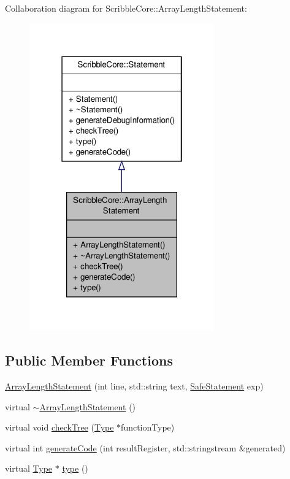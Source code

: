 Collaboration diagram for Scribble\-Core\-:\-:Array\-Length\-Statement\-:
\nopagebreak
\begin{figure}[H]
\begin{center}
\leavevmode
\includegraphics[width=226pt]{class_scribble_core_1_1_array_length_statement__coll__graph}
\end{center}
\end{figure}
\subsection*{Public Member Functions}
\begin{DoxyCompactItemize}
\item 
\hyperlink{class_scribble_core_1_1_array_length_statement_a0f373eaf826db2565073f5da6b7d3de7}{Array\-Length\-Statement} (int line, std\-::string text, \hyperlink{namespace_scribble_core_a2ad5bf236bc9164cb56f564685f15a11}{Safe\-Statement} exp)
\item 
virtual \hyperlink{class_scribble_core_1_1_array_length_statement_aca514b8a7518cae4286fd3a7ae2fac95}{$\sim$\-Array\-Length\-Statement} ()
\item 
virtual void \hyperlink{class_scribble_core_1_1_array_length_statement_a7861cbb5791ce1d651dad677f000e757}{check\-Tree} (\hyperlink{class_scribble_core_1_1_type}{Type} $\ast$function\-Type)
\item 
virtual int \hyperlink{class_scribble_core_1_1_array_length_statement_ae47bb975e562d05b1c3da60b3f7e40aa}{generate\-Code} (int result\-Register, std\-::stringstream \&generated)
\item 
virtual \hyperlink{class_scribble_core_1_1_type}{Type} $\ast$ \hyperlink{class_scribble_core_1_1_array_length_statement_ac7c1deececdad51dc373ce4942f99ddc}{type} ()
\end{DoxyCompactItemize}


